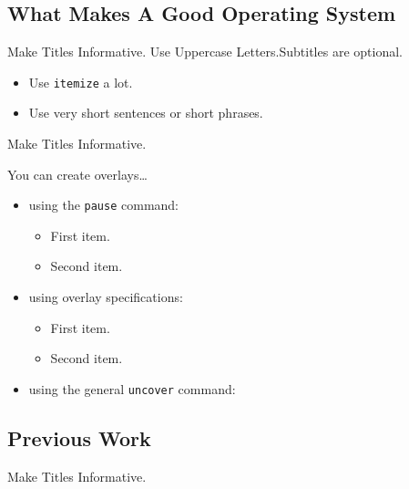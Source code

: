 \documentclass{beamer}
\begin{document}
\subsection {What Makes A Good Operating System}
\begin{frame}{Make Titles Informative. Use Uppercase Letters.}{Subtitles are optional.}

  \begin{itemize}
  \item
    Use \texttt{itemize} a lot.
  \item
    Use very short sentences or short phrases.
  \end{itemize}
\end{frame}

\begin{frame}{Make Titles Informative.}

  You can create overlays\dots
  \begin{itemize}
  \item using the \texttt{pause} command:
    \begin{itemize}
    \item
      First item.
      \pause
    \item    
      Second item.
    \end{itemize}
  \item
    using overlay specifications:
    \begin{itemize}
    \item<3->
      First item.
    \item<4->
      Second item.
    \end{itemize}
  \item
    using the general \texttt{uncover} command:
    \begin{itemize}
    \end{itemize}
  \end{itemize}
\end{frame}


\subsection{Previous Work}

\begin{frame}{Make Titles Informative.}
\end{frame}
\end{document}
